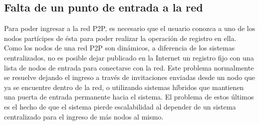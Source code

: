   \subsection{Falta de un punto de entrada a la red}
        Para poder ingresar a la red P2P, es necesario que el usuario conozca a
      uno de los nodos partícipes de ésta para poder realizar la operación de
      registro en ella. Como los nodos de una red P2P son dinámicos, a diferencia
      de los sistemas centralizados, no es posible dejar publicado en la Internet
      un registro fijo con una lista de nodos de entrada para conectarse con la
      red. Este problema normalmente se resuelve dejando el ingreso a través de
      invitaciones enviadas desde un nodo que ya se encuentre dentro de la red, o
      utilizando sistemas híbridos que mantienen una puerta de entrada permanente
      hacia el sistema. El problema de estos últimos es el hecho de que el
      sistema pierde escalabilidad al depender de un sistema centralizado para el
      ingreso de más nodos al mismo.

    
    
